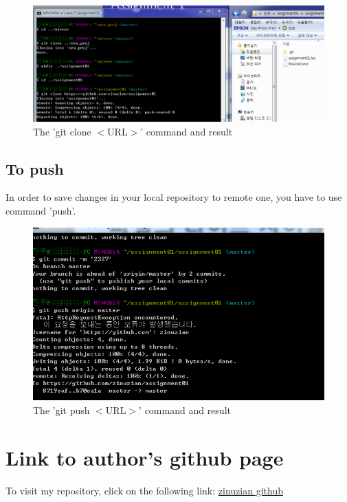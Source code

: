 \documentclass{article}
\begin{document}
    \begin{figure}[h!]
    \centering
    \includegraphics[scale=0.5]{git_clone_remote}
    \caption{The 'git clone $<$URL$>$' command and result}
    \label{fig:clone_local}
    \end{figure}
    
    \subsection {To push}
    In order to save changes in your local repository to remote one, you have to use command 'push'. 
    \begin{figure}[h!]
    \centering
    \includegraphics[scale=0.5]{git_push}
    \caption{The 'git push $<$URL$>$' command and result}
    \label{fig:clone_local}
    \end{figure}
    

\section{Link to author's github page}
To visit my repository, click on the following link: 
\href{https://github.com/zinuzian/assignment01}{zinuzian github}
\end{document}
